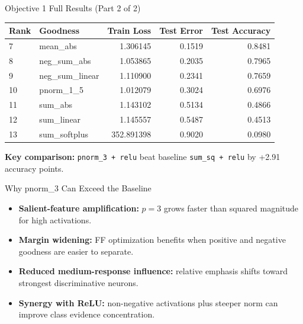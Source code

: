 \documentclass[aspectratio=169]{beamer}
\begin{document}
\begin{frame}{Objective 1 Full Results (Part 2 of 2)}
\scriptsize
\begin{table}[h]
\centering
\begin{tabular}{l l r r r}
\hline
Rank & Goodness & Train Loss & Test Error & Test Accuracy \\
\hline
7 & mean\_abs & 1.306145 & 0.1519 & 0.8481 \\
8 & neg\_sum\_abs & 1.053865 & 0.2035 & 0.7965 \\
9 & neg\_sum\_linear & 1.110900 & 0.2341 & 0.7659 \\
10 & pnorm\_1\_5 & 1.012079 & 0.3024 & 0.6976 \\
11 & sum\_abs & 1.143102 & 0.5134 & 0.4866 \\
12 & sum\_linear & 1.145557 & 0.5487 & 0.4513 \\
13 & sum\_softplus & 352.891398 & 0.9020 & 0.0980 \\
\hline
\end{tabular}
\end{table}
\normalsize

\textbf{Key comparison:} \texttt{pnorm\_3 + relu} beat baseline \texttt{sum\_sq + relu} by +2.91 accuracy points.
\end{frame}

\begin{frame}{Why pnorm\_3 Can Exceed the Baseline}
\begin{itemize}
  \item \textbf{Salient-feature amplification:} \(p=3\) grows faster than squared magnitude for high activations.
  \item \textbf{Margin widening:} FF optimization benefits when positive and negative goodness are easier to separate.
  \item \textbf{Reduced medium-response influence:} relative emphasis shifts toward strongest discriminative neurons.
  \item \textbf{Synergy with ReLU:} non-negative activations plus steeper norm can improve class evidence concentration.
\end{itemize}
\end{frame}
\end{document}
